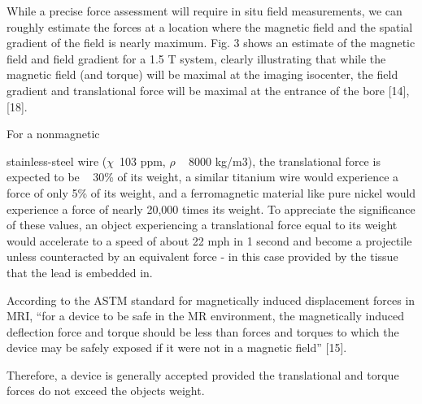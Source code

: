 While a precise force assessment will require in situ field measurements, we
can roughly estimate the forces at a location where the magnetic field and the
spatial gradient of the field is nearly maximum. Fig. 3 shows an estimate of
the magnetic field and field gradient for a 1.5 T system, clearly illustrating
that while the magnetic field (and torque) will be maximal at the imaging
isocenter, the field gradient and translational force will be maximal at the
entrance of the bore [14], [18]. 


For a nonmagnetic

stainless-steel wire ($\chi$~103 ppm, $\rho$ ~ 8000 kg/m3), the translational force is
expected to be ~ 30\% of its weight, a similar titanium wire would experience
a force of only 5\% of its weight, and a ferromagnetic material like pure nickel
would experience a force of nearly 20,000 times its weight. To appreciate the
significance of these values, an object experiencing a translational force equal
to its weight would accelerate to a speed of about 22 mph in 1 second and
become a projectile unless counteracted by an equivalent force - in this case
provided by the tissue that the lead is embedded in. 

According to the ASTM standard for magnetically
induced displacement forces in MRI, “for a device to be safe in the MR environment, the magnetically induced deflection
force and torque should be less than forces and torques to which the device may be safely exposed if it were not in a magnetic
field” [15]. 

Therefore, a device is generally accepted provided the translational and torque forces do not exceed the objects
weight.

